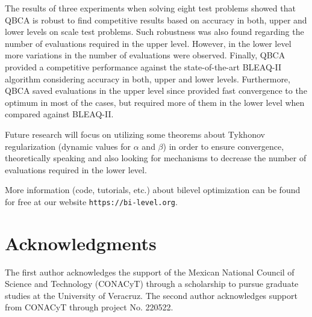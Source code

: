 \documentclass[conference]{IEEEtran}
\theoremstyle{definition}
\begin{document}
The results of three experiments when solving eight test problems showed that QBCA
is robust to find competitive results based on accuracy in both, upper and lower
levels on scale test problems. Such robustness was also found regarding the number
of evaluations required in the upper level. However, in the lower level more variations
in the number of evaluations were observed. Finally, QBCA provided a competitive
performance against the state-of-the-art BLEAQ-II algorithm considering accuracy
in both, upper and lower levels. Furthermore, QBCA saved evaluations in the upper
level since provided fast convergence to the optimum in most of the cases, but
required more of them in the lower level when compared against BLEAQ-II. 

Future research will focus on utilizing some theorems about Tykhonov regularization
(dynamic values for $\alpha$ and $\beta$) in order to ensure convergence, theoretically
speaking and also looking for mechanisms to decrease the number of evaluations
required in the lower level.

More information (code, tutorials, etc.) about bilevel optimization can be found
for free at our website \verb|https://bi-level.org|.


\section*{Acknowledgments} %
The first author acknowledges the support of the Mexican National Council of Science
and Technology (CONACyT) through a scholarship to pursue graduate studies at the
University of Veracruz. The second author acknowledges support from CONACyT through
project No. 220522. 






\end{document}
